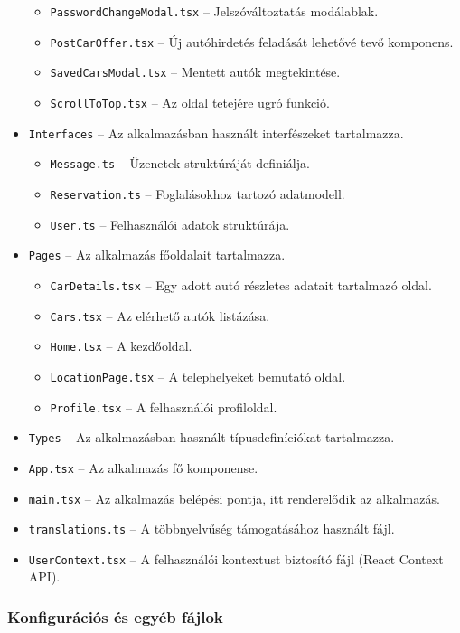 \documentclass{report}[11pt]
\begin{document}
\begin{itemize}
\begin{itemize}
        \item \texttt{PasswordChangeModal.tsx} – Jelszóváltoztatás modálablak.
        \item \texttt{PostCarOffer.tsx} – Új autóhirdetés feladását lehetővé tevő komponens.
        \item \texttt{SavedCarsModal.tsx} – Mentett autók megtekintése.
        \item \texttt{ScrollToTop.tsx} – Az oldal tetejére ugró funkció.
    \end{itemize}
    \item \texttt{Interfaces} – Az alkalmazásban használt interfészeket tartalmazza.
    \begin{itemize}
        \item \texttt{Message.ts} – Üzenetek struktúráját definiálja.
        \item \texttt{Reservation.ts} – Foglalásokhoz tartozó adatmodell.
        \item \texttt{User.ts} – Felhasználói adatok struktúrája.
    \end{itemize}
    \item \texttt{Pages} – Az alkalmazás főoldalait tartalmazza.
    \begin{itemize}
        \item \texttt{CarDetails.tsx} – Egy adott autó részletes adatait tartalmazó oldal.
        \item \texttt{Cars.tsx} – Az elérhető autók listázása.
        \item \texttt{Home.tsx} – A kezdőoldal.
        \item \texttt{LocationPage.tsx} – A telephelyeket bemutató oldal.
        \item \texttt{Profile.tsx} – A felhasználói profiloldal.
    \end{itemize}
    \item \texttt{Types} – Az alkalmazásban használt típusdefiníciókat tartalmazza.
    \item \texttt{App.tsx} – Az alkalmazás fő komponense.
    \item \texttt{main.tsx} – Az alkalmazás belépési pontja, itt renderelődik az alkalmazás.
    \item \texttt{translations.ts} – A többnyelvűség támogatásához használt fájl.
    \item \texttt{UserContext.tsx} – A felhasználói kontextust biztosító fájl (React Context API).
\end{itemize}

\subsubsection{Konfigurációs és egyéb fájlok}
\end{document}
